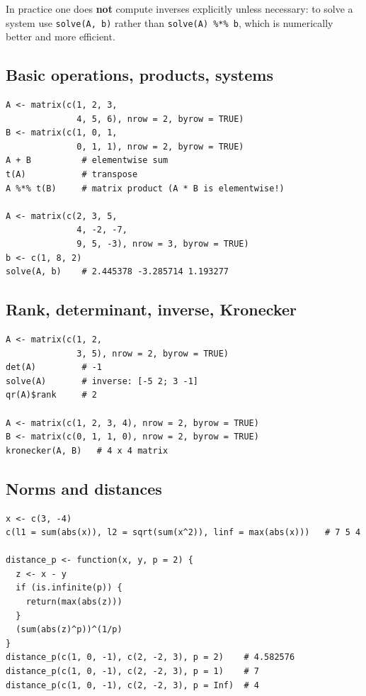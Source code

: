 In practice one does \textbf{not} compute inverses explicitly unless necessary: to solve a system use
\texttt{solve(A, b)} rather than \texttt{solve(A) \%*\% b}, which is numerically better and more efficient.

\subsection{Basic operations, products, systems}

\begin{lstlisting}
A <- matrix(c(1, 2, 3,
              4, 5, 6), nrow = 2, byrow = TRUE)
B <- matrix(c(1, 0, 1,
              0, 1, 1), nrow = 2, byrow = TRUE)
A + B          # elementwise sum
t(A)           # transpose
A %*% t(B)     # matrix product (A * B is elementwise!)

A <- matrix(c(2, 3, 5,
              4, -2, -7,
              9, 5, -3), nrow = 3, byrow = TRUE)
b <- c(1, 8, 2)
solve(A, b)    # 2.445378 -3.285714 1.193277
\end{lstlisting}

\subsection{Rank, determinant, inverse, Kronecker}

\begin{lstlisting}
A <- matrix(c(1, 2,
              3, 5), nrow = 2, byrow = TRUE)
det(A)         # -1
solve(A)       # inverse: [-5 2; 3 -1]
qr(A)$rank     # 2

A <- matrix(c(1, 2, 3, 4), nrow = 2, byrow = TRUE)
B <- matrix(c(0, 1, 1, 0), nrow = 2, byrow = TRUE)
kronecker(A, B)   # 4 x 4 matrix
\end{lstlisting}

\subsection{Norms and distances}

\begin{lstlisting}
x <- c(3, -4)
c(l1 = sum(abs(x)), l2 = sqrt(sum(x^2)), linf = max(abs(x)))   # 7 5 4

distance_p <- function(x, y, p = 2) {
  z <- x - y
  if (is.infinite(p)) {
    return(max(abs(z)))
  }
  (sum(abs(z)^p))^(1/p)
}
distance_p(c(1, 0, -1), c(2, -2, 3), p = 2)    # 4.582576
distance_p(c(1, 0, -1), c(2, -2, 3), p = 1)    # 7
distance_p(c(1, 0, -1), c(2, -2, 3), p = Inf)  # 4
\end{lstlisting}

